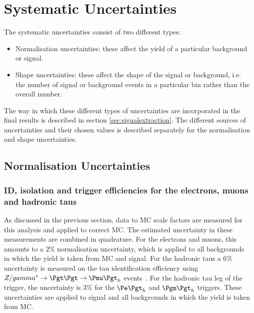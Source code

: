 \section{Systematic Uncertainties}
\label{sec:systematics}

The systematic uncertainties consist of two different types:

\begin{itemize} 
\item Normalisation uncertainties: these affect the yield of a particular background or
signal.
\item Shape uncertainties: these affect the shape of the signal or background,
i.e. the number of signal or background events in a particular bin rather
than the overall number.
\end{itemize}

The way in which these different types of uncertainties are incorporated in the
final results is described in section \ref{sec:signalextraction}. The different
sources of uncertainties and their chosen values is described separately for the 
normalisation and shape uncertainties.

\subsection{Normalisation Uncertainties}
\label{sec:systematicUncertainties_yield}

\subsubsection{\textbf{ID, isolation and trigger efficiencies for the electrons, muons and
hadronic taus}}
As discussed in the previous section, data to \ac{MC} scale factors are measured for this 
analysis and applied to correct \ac{MC}. The estimated uncertainty in these
measurements are combined in quadrature. For the electrons and muons, this
amounts to a $2\%$ normalisation uncertainty, which is applied to all
backgrounds in which the yield is taken from MC and signal.
For the hadronic taus a $6\%$ uncertainty
is measured on the tau identification efficiency using 
$Z/\gamma^{*} \to \Pgt\Pgt \to \Pmu\Pgt_{h}$ events~\cite{Chatrchyan:2012zz}. 
For the hadronic tau leg of the trigger, the uncertainty is $3\%$ for the $\etau$ and $\mutau$ triggers.
These uncertainties are applied to signal and all backgrounds in which the yield
is taken from \ac{MC}.

